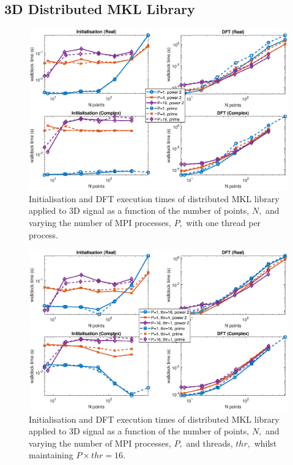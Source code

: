 \documentclass[a4paper]{article}
\begin{document}
\subsection{3D Distributed MKL Library}\label{Sec:3DDistMKL}

\begin{figure}[htb]
    \centering
    \includegraphics[width=\linewidth]{../results/mkl_3d_mpi.eps}
  \caption{Initialisation and DFT execution times of distributed MKL library applied to 3D signal as a function of the
    number of points, $N,$ and varying the number of MPI processes, $P,$ with one thread per process.}
  \label{3DDistMKL}
\end{figure}

\begin{figure}[htb]
    \centering
    \includegraphics[width=\linewidth]{../results/mkl_3d_mpi_thr.eps}
  \caption{Initialisation and DFT execution times of distributed MKL library applied to 3D signal as a function of the
    number of points, $N,$ and varying the number of MPI processes, $P,$ and threads, $thr,$ whilst maintaining $P\times thr=16.$}
  \label{3DDistMKL16}
\end{figure}
\end{document}
